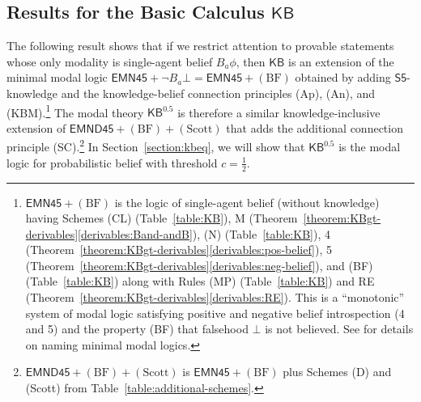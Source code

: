 \documentclass[12pt]{article}
\theoremstyle{definition}
\newcommand{\KB}{{\mathsf{KB}}}                        %
\newcommand{\KBeq}{{\mathsf{KB}^{\mathsf{0.5}}}}       %
\begin{document}
\subsection{Results for the Basic Calculus \texorpdfstring{$\KB$}{KB}}

The following result shows that if we restrict attention to provable
statements whose only modality is single-agent belief $B_a\phi$, then
$\KB$ is an extension of the minimal modal logic $\mathsf{EMN45}+\lnot
B_a\bot=\mathsf{EMN45}+(\text{BF})$ obtained by adding
$\mathsf{S5}$-knowledge and the knowledge-belief connection principles
(Ap), (An), and (KBM).\footnote{$\mathsf{EMN45}+(\text{BF})$ is the
  logic of single-agent belief (without knowledge) having Schemes (CL)
  (Table~\ref{table:KB}), M
  (Theorem~\ref{theorem:KBgt-derivables}\eqref{derivables:Band-andB}), (N)
  (Table~\ref{table:KB}), 4
  (Theorem~\ref{theorem:KBgt-derivables}\eqref{derivables:pos-belief}), 5
  (Theorem~\ref{theorem:KBgt-derivables}\eqref{derivables:neg-belief}), and
  (BF) (Table~\ref{table:KB}) along with Rules (MP)
  (Table~\ref{table:KB}) and RE
  (Theorem~\ref{theorem:KBgt-derivables}\eqref{derivables:RE}). This is a
  ``monotonic'' system of modal logic satisfying positive and negative
  belief introspection (4 and 5) and the property (BF) that falsehood
  $\bot$ is not believed. See \cite[Ch.~8]{Chellas:ml} for details on
  naming minimal modal logics.} The modal theory $\KBeq$ is therefore
a similar knowledge-inclusive extension of
$\mathsf{EMND45}+(\text{BF})+(\text{Scott})$ that adds the additional
connection principle
(SC).\footnote{$\mathsf{EMND45}+(\text{BF})+(\text{Scott})$ is
  $\mathsf{EMN45}+(\text{BF})$ plus Schemes (D) and (Scott) from
  Table~\ref{table:additional-schemes}.}  In
Section~\ref{section:kbeq}, we will show that $\KBeq$ is the modal
logic for probabilistic belief with threshold $c=\frac 12$.
\end{document}
